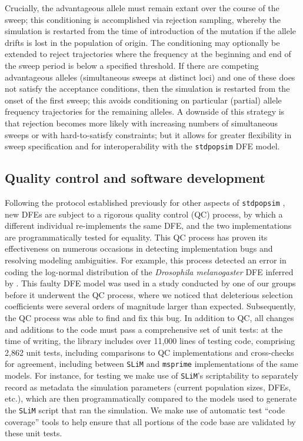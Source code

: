 \documentclass[hidelinks]{article}
\newcommand{\stdpopsim}{\texttt{stdpopsim}\xspace}
\newcommand{\slim}{\texttt{SLiM}\xspace}
\newcommand{\msprime}{\texttt{msprime}\xspace}
\begin{document}
    Crucially, the advantageous allele must remain extant over the course of
    the sweep; this conditioning is accomplished via rejection sampling,
    whereby the simulation is restarted from the time of introduction of the mutation if the
    allele drifts is lost in the population of origin. The conditioning may
    optionally be extended to reject trajectories where the frequency at the
    beginning and end of the sweep period is below a specified threshold. If
    there are competing advantageous alleles (simultaneous sweeps at distinct
    loci) and one of these does not satisfy the acceptance conditions, then the
    simulation is restarted from the onset of the first sweep; this avoids
    conditioning on particular (partial) allele frequency trajectories for the
    remaining alleles.  A downside of this strategy is that rejection becomes
    more likely with increasing numbers of simultaneous sweeps or with
    hard-to-satisfy constraints; but it allows for greater flexibility in sweep
    specification and for interoperability with the \stdpopsim DFE model.
    

    \subsection*{Quality control and software development}
    Following the protocol established previously for other aspects of \stdpopsim{} \citep{adrion2020community},
    new DFEs are subject to a rigorous quality control (QC) process,
    by which a different individual re-implements the same DFE, and the two implementations
    are programmatically tested for equality.
    This QC process has proven its effectiveness on numerous occasions in detecting implementation bugs
    and resolving modeling ambiguities.
    For example, this process detected  an error in coding the log-normal distribution of
    the \textit{Drosophila melanogaster} DFE inferred by \citet[\stdpopsim label \texttt{LognormalPlusPositive\_R16}]{booker2021selective}.
    This faulty DFE model was used in a study conducted by one of our groups before it underwent the QC process,
    where we noticed that deleterious selection coefficients
    were several orders of magnitude larger than expected.
    Subsequently, the QC process was able to find and fix this bug.
    In addition to QC, all changes and additions to the code must pass a comprehensive set of unit tests:
    at the time of writing, the library includes over 11,000 lines of testing code,
    comprising 2,862 unit tests, including comparisons to QC implementations
    and cross-checks for agreement, including between \slim and \msprime implementations of the same models.
    For instance, for testing we make use of \slim's scriptability to separately record as metadata
    the simulation parameters (current population sizes, DFEs, etc.),
    which are then programmatically compared to the models used to generate the \slim script
    that ran the simulation.
    We make use of automatic test ``code coverage'' tools to help ensure that all portions of the code base
    are validated by these unit tests.
\end{document}
